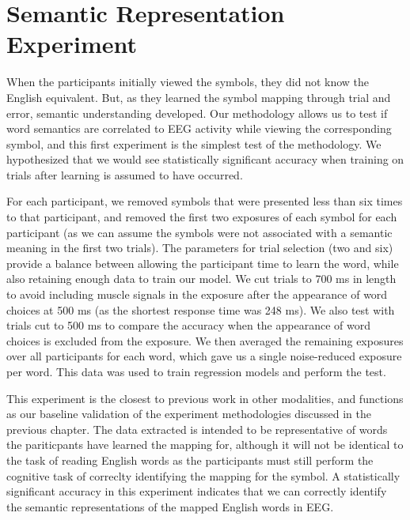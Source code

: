 \section{Semantic Representation Experiment}
\label{sec:experiments:semanticrepresentation}
When the participants initially viewed the symbols, they did not know the 
English equivalent. But, as they learned the symbol mapping through trial and 
error, semantic understanding developed. Our methodology allows us to test if 
word semantics are correlated to EEG activity while viewing the corresponding 
symbol, and this first experiment is the simplest test of the methodology. We 
hypothesized that we would see statistically significant accuracy when training 
on trials after learning is assumed to have occurred.

For each participant, we removed symbols that were presented less than six 
times to that participant, and removed the first two exposures of each symbol 
for each participant (as we can assume the symbols were not associated with a 
semantic meaning in the first two trials). The parameters for trial selection 
(two and six) provide a balance between allowing the participant time to learn 
the word, while also retaining enough data to train our model. We cut trials to 
700 ms in length to avoid including muscle signals in the exposure after the 
appearance of word choices at 500 ms (as the shortest response time was 248 
ms).  We also test with trials cut to 500 ms to compare the \tvt accuracy when 
the appearance of word choices is excluded from the exposure. We then averaged 
the remaining exposures over all participants for each word, which gave us a 
single noise-reduced exposure per word. This data was used to train regression 
models and perform the \tvt test. 

This experiment is the closest to previous work in other modalities, and 
functions as our baseline validation of the experiment methodologies discussed 
in the previous chapter. The data extracted is intended to be representative of 
words the pariticpants have learned the mapping for, although it will not be 
identical to the task of reading English words as the participants must still 
perform the cognitive task of correclty identifying the mapping for the symbol.  
A statistically significant \tvt accuracy in this experiment indicates that we 
can correctly identify the semantic representations of the mapped English words 
in EEG.
